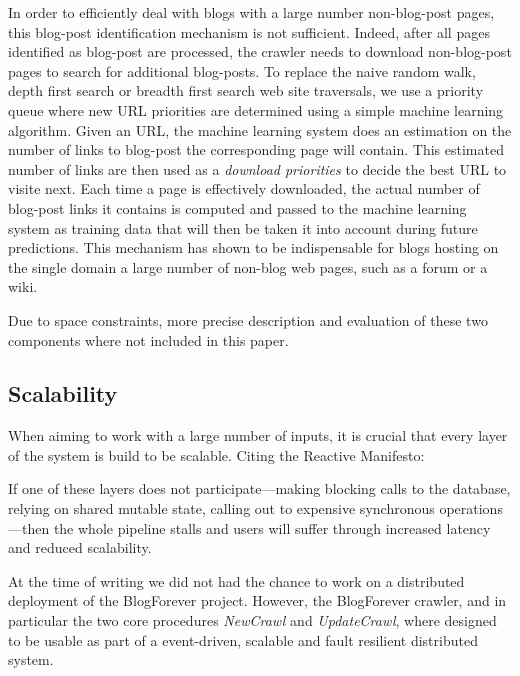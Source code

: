 In order to efficiently deal with blogs with a large number non-blog-post pages, this blog-post identification mechanism is not sufficient. Indeed, after all pages identified as blog-post are processed, the crawler needs to download non-blog-post pages to search for additional blog-posts. To replace the naive random walk, depth first search or breadth first search web site traversals, we use a priority queue where new URL priorities are determined using a simple machine learning algorithm. Given an URL, the machine learning system does an estimation on the number of links to blog-post the corresponding page will contain. This estimated number of links are then used as a \emph{download priorities} to decide the best URL to visite next. Each time a page is effectively downloaded, the actual number of blog-post links it contains is computed and passed to the machine learning system as training data that will then be taken it into account during future predictions. This mechanism has shown to be indispensable for blogs hosting on the single domain a large number of non-blog web pages, such as a forum or a wiki.

Due to space constraints, more precise description and evaluation of these two components where not included in this paper.


\subsection{Scalability}
When aiming to work with a large number of inputs, it is crucial that every layer of the system is build to be scalable. Citing the Reactive Manifesto\cite{thereactivemanifesto2013}:

\begin{quoting}
  If one of these layers does not participate—making blocking calls to the database, relying on shared mutable state, calling out to expensive synchronous operations—then the whole pipeline stalls and users will suffer through increased latency and reduced scalability.
\end{quoting}

At the time of writing we did not had the chance to work on a distributed deployment of the BlogForever project. However, the BlogForever crawler, and in particular the two core procedures \emph{NewCrawl} and \emph{UpdateCrawl}, where designed to be usable as part of a event-driven, scalable and fault resilient distributed system.


